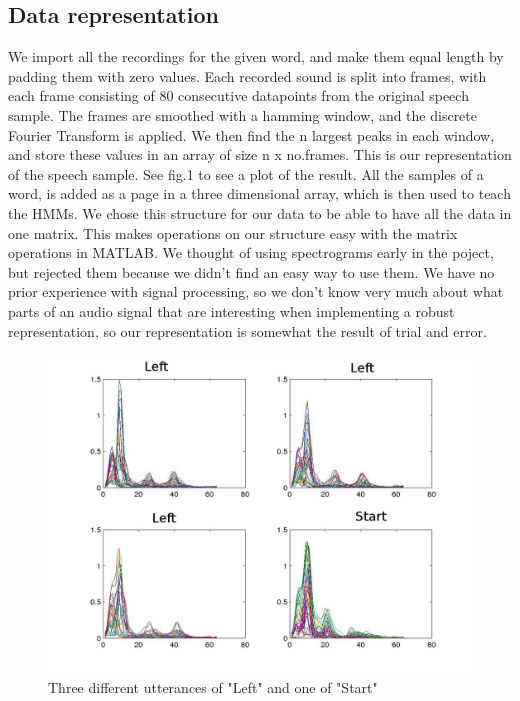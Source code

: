 \documentclass[titlepage]{article}
\begin{document}
    \subsection{Data representation} 
    We import all the recordings for the given word, and make them equal length by padding them with zero values. Each recorded sound is split into frames, with each frame consisting of 80 consecutive datapoints from the original speech sample. The frames are smoothed with a hamming window, and the discrete Fourier Transform is applied. We then find the n largest peaks in each window, and store these values in an array of size n x no.frames. This is our representation of the speech sample. See fig.1 to see a plot of the result. All the samples of a word, is added as a page in a three dimensional array, which is then used to teach the HMMs.
We chose this structure for our data to be able to have all the data in one matrix. This makes operations on our structure easy with the matrix operations in MATLAB. We thought of using spectrograms early in the poject, but rejected them because we didn't find an easy way to use them.
We have no prior experience with signal processing, so we don't know very much about what parts of an audio signal that are interesting when implementing a robust representation, so our representation is somewhat the result of trial and error.  
\begin{figure}[Frames plotted]
     \includegraphics[scale=0.3]{leftleftleftgo}
    \caption{Three different utterances of "Left" and one of "Start"}
\end{figure}
\end{document}
